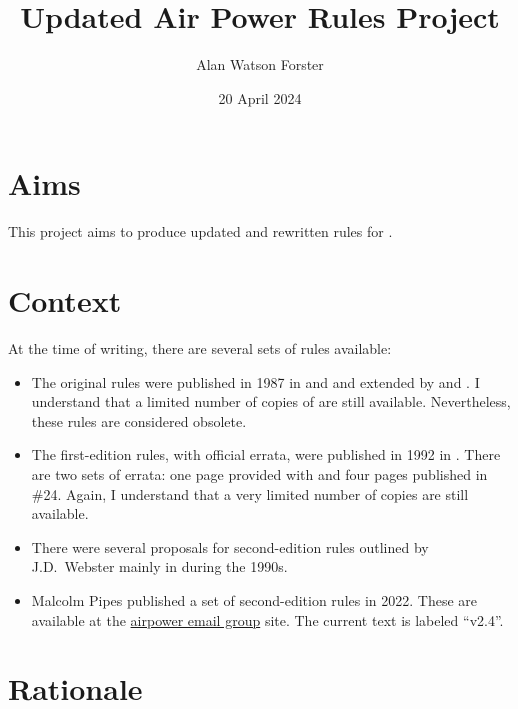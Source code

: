 \documentclass[10pt]{report}
\title{Updated Air Power Rules Project}
\author{Alan Watson Forster}
\date{20 April 2024}
\begin{document}
\twocolumn
\thispagestyle{empty}
\maketitle
\suppressfloats

\section{Aims}

This project aims to produce updated and rewritten rules for {\AirPow}.

\section{Context}

At the time of writing, there are several sets of rules available:
\begin{itemize}
    \item The original rules were published in 1987 in {\AirSup} and {\AirStr}  and extended by {\DF} and {\EOTG}. I understand that a limited number of copies of {\AirSup} are still available. Nevertheless, these rules are considered obsolete.
    \item The first-edition {\AirPow} rules, with official errata, were published in 1992 in {\TSOH}. There are two sets of errata: one page provided with {\TSOH} and four pages published in {\APJ} \#24. Again, I understand that a very limited number of copies are still available.
    \item There were several proposals for second-edition rules outlined by J.D.\ Webster mainly in {\APJ} during the 1990s.
    \item Malcolm Pipes published a set of second-edition {\AirPow} rules in 2022. These are available at the \href{https://airpower.groups.io/g/main}{airpower email group} site. The current text is labeled “v2.4”.
\end{itemize}

\section{Rationale}
\end{document}
